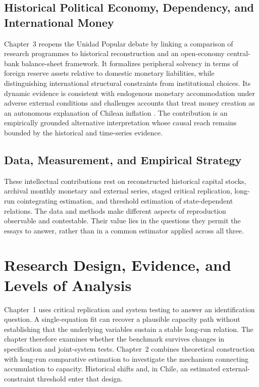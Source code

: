 \subsection*{Historical Political Economy, Dependency, and International Money}

Chapter~3 reopens the Unidad Popular debate by linking a comparison of research programmes to historical reconstruction and an open-economy central-bank balance-sheet framework. It formalizes peripheral solvency in terms of foreign reserve assets relative to domestic monetary liabilities, while distinguishing international structural constraints from institutional choices. Its dynamic evidence is consistent with endogenous monetary accommodation under adverse external conditions and challenges accounts that treat money creation as an autonomous explanation of Chilean inflation \citep{DornbuschEdwards1990,Edwards2024}. The contribution is an empirically grounded alternative interpretation whose causal reach remains bounded by the historical and time-series evidence.

\subsection*{Data, Measurement, and Empirical Strategy}

These intellectual contributions rest on reconstructed historical capital stocks, archival monthly monetary and external series, staged critical replication, long-run cointegrating estimation, and threshold estimation of state-dependent relations. The data and methods make different aspects of reproduction observable and contestable. Their value lies in the questions they permit the essays to answer, rather than in a common estimator applied across all three.

\section*{Research Design, Evidence, and Levels of Analysis}

Chapter~1 uses critical replication and system testing to answer an identification question. A single-equation fit can recover a plausible capacity path without establishing that the underlying variables sustain a stable long-run relation. The chapter therefore examines whether the benchmark survives changes in specification and joint-system tests. Chapter~2 combines theoretical construction with long-run comparative estimation to investigate the mechanism connecting accumulation to capacity. Historical shifts and, in Chile, an estimated external-constraint threshold enter that design.

